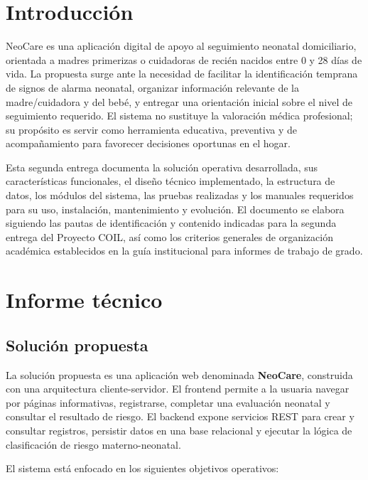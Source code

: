 \documentclass[12pt,letterpaper]{article}
\begin{document}
\section{Introducción}

NeoCare es una aplicación digital de apoyo al seguimiento neonatal domiciliario, orientada a madres primerizas o cuidadoras de recién nacidos entre 0 y 28 días de vida. La propuesta surge ante la necesidad de facilitar la identificación temprana de signos de alarma neonatal, organizar información relevante de la madre/cuidadora y del bebé, y entregar una orientación inicial sobre el nivel de seguimiento requerido. El sistema no sustituye la valoración médica profesional; su propósito es servir como herramienta educativa, preventiva y de acompañamiento para favorecer decisiones oportunas en el hogar.

Esta segunda entrega documenta la solución operativa desarrollada, sus características funcionales, el diseño técnico implementado, la estructura de datos, los módulos del sistema, las pruebas realizadas y los manuales requeridos para su uso, instalación, mantenimiento y evolución. El documento se elabora siguiendo las pautas de identificación y contenido indicadas para la segunda entrega del Proyecto COIL, así como los criterios generales de organización académica establecidos en la guía institucional para informes de trabajo de grado.

\section{Informe técnico}

\subsection{Solución propuesta}

La solución propuesta es una aplicación web denominada \textbf{NeoCare}, construida con una arquitectura cliente-servidor. El frontend permite a la usuaria navegar por páginas informativas, registrarse, completar una evaluación neonatal y consultar el resultado de riesgo. El backend expone servicios REST para crear y consultar registros, persistir datos en una base relacional y ejecutar la lógica de clasificación de riesgo materno-neonatal.

El sistema está enfocado en los siguientes objetivos operativos:
\end{document}
